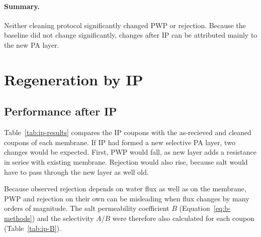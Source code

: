 \paragraph{Summary.}
Neither cleaning protocol significantly changed PWP or rejection. Because the baseline did not change significantly, changes after IP can be attributed mainly to the new PA layer.


\section{Regeneration by IP}
\label{sec:res-ip}


\subsection{Performance after IP}
\label{sec:res-ip-perf}
Table~\ref{tab:ip-results} compares the IP coupons with the as-recieved and cleaned coupons of each membrane. If IP had formed a new selective PA layer, two changes would be expected. First, PWP would fall, as new layer adds a resistance in series with existing membrane. Rejection would also rise, because salt would have to pass through the new layer as well old. 

Because observed rejection depends on water flux as well as on the membrane, PWP and rejection on their own can be misleading when flux changes by many orders of magnitude. The salt permeability coefficient $B$ (Equation~\ref{eq:b-methods}) and the selectivity $A/B$ were therefore also calculated for each coupon (Table~\ref{tab:ip-B}).

